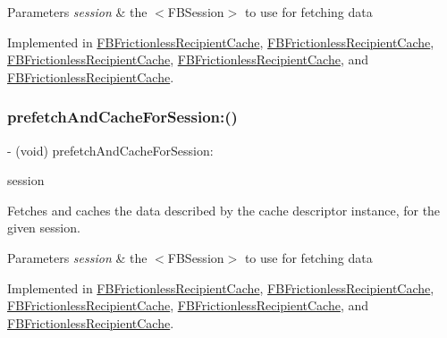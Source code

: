 \begin{DoxyParams}{Parameters}
{\em session} & the $<$\+F\+B\+Session$>$ to use for fetching data \\
\hline
\end{DoxyParams}


Implemented in \hyperlink{interfaceFBFrictionlessRecipientCache_a4f218828f2b6a8bb5a8e0044e98689dc}{F\+B\+Frictionless\+Recipient\+Cache}, \hyperlink{interfaceFBFrictionlessRecipientCache_a4f218828f2b6a8bb5a8e0044e98689dc}{F\+B\+Frictionless\+Recipient\+Cache}, \hyperlink{interfaceFBFrictionlessRecipientCache_a4f218828f2b6a8bb5a8e0044e98689dc}{F\+B\+Frictionless\+Recipient\+Cache}, \hyperlink{interfaceFBFrictionlessRecipientCache_a4f218828f2b6a8bb5a8e0044e98689dc}{F\+B\+Frictionless\+Recipient\+Cache}, and \hyperlink{interfaceFBFrictionlessRecipientCache_a4f218828f2b6a8bb5a8e0044e98689dc}{F\+B\+Frictionless\+Recipient\+Cache}.

\mbox{\label{interfaceFBCacheDescriptor_a1d3bbb38753d402a6f08e9402904a8d6}} 
\subsubsection{\texorpdfstring{prefetch\+And\+Cache\+For\+Session\+:()}{prefetchAndCacheForSession:()}\hspace{0.1cm}{\footnotesize\ttfamily [2/5]}}
{\footnotesize\ttfamily -\/ (void) prefetch\+And\+Cache\+For\+Session\+: \begin{DoxyParamCaption}\item[{(\hyperlink{interfaceFBSession}{F\+B\+Session} $\ast$)}]{session }\end{DoxyParamCaption}}

Fetches and caches the data described by the cache descriptor instance, for the given session.


\begin{DoxyParams}{Parameters}
{\em session} & the $<$\+F\+B\+Session$>$ to use for fetching data \\
\hline
\end{DoxyParams}


Implemented in \hyperlink{interfaceFBFrictionlessRecipientCache_a4f218828f2b6a8bb5a8e0044e98689dc}{F\+B\+Frictionless\+Recipient\+Cache}, \hyperlink{interfaceFBFrictionlessRecipientCache_a4f218828f2b6a8bb5a8e0044e98689dc}{F\+B\+Frictionless\+Recipient\+Cache}, \hyperlink{interfaceFBFrictionlessRecipientCache_a4f218828f2b6a8bb5a8e0044e98689dc}{F\+B\+Frictionless\+Recipient\+Cache}, \hyperlink{interfaceFBFrictionlessRecipientCache_a4f218828f2b6a8bb5a8e0044e98689dc}{F\+B\+Frictionless\+Recipient\+Cache}, and \hyperlink{interfaceFBFrictionlessRecipientCache_a4f218828f2b6a8bb5a8e0044e98689dc}{F\+B\+Frictionless\+Recipient\+Cache}.

